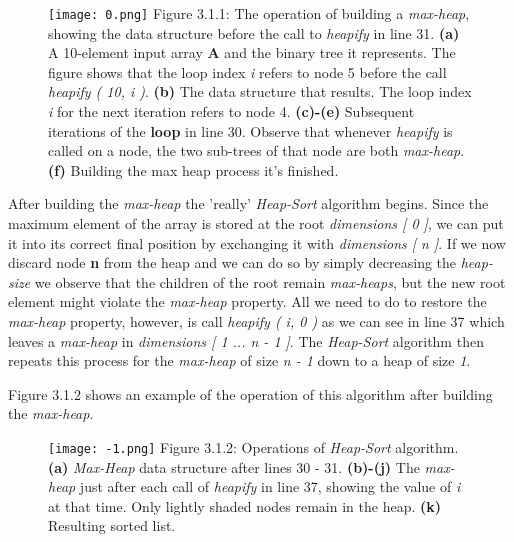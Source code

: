 \begin{figure}[H]
\texttt{[image: 0.png]}
{\centering \linebreak \linebreak \small Figure 3.1.1: The operation of building a {\itshape max-heap}, showing the data structure before the call to {\itshape heapify} in line 31. {\bfseries (a)} A 10-element input array {\bfseries A} and the binary tree it represents. The figure shows that the loop index {\itshape i} refers to node 5 before the call {\itshape heapify ( 10, i )}. {\bfseries (b)} The data structure that results. The loop index {\itshape i} for the next iteration refers to node 4. {\bfseries (c)-(e)} Subsequent iterations of the {\bfseries loop} in line 30. Observe that whenever {\itshape heapify} is called on a node, the two sub-trees of that node are both {\itshape max-heap}. {\bfseries (f)} Building the max heap process it's finished.}
\end{figure} \hfill \break

After building the {\itshape max-heap} the 'really' {\itshape Heap-Sort} algorithm begins. Since the maximum element of the array is stored at the root {\itshape dimensions [ 0 ]}, we can put it into its correct final position by exchanging it with {\itshape dimensions [ n ]}. If we now discard node {\bfseries n} from the heap and we can do so by simply decreasing the {\itshape heap-size} we observe that the children of the root remain {\itshape max-heaps}, but the new root element might violate the {\itshape max-heap} property. All we need to do to restore the {\itshape max-heap} property, however, is call {\itshape heapify ( i, 0 )} as we can see in line 37 which leaves a {\itshape max-heap} in {\itshape dimensions [ 1 ... n - 1 ]}. The {\itshape Heap-Sort} algorithm then repeats this process for the {\itshape max-heap} of size {\itshape n - 1} down to a heap of size {\itshape 1}. \hfill \break

Figure 3.1.2 shows an example of the operation of this algorithm after building the {\itshape max-heap}. \hfill \break 

\begin{figure}[H]
\texttt{[image: -1.png]}
{\centering \linebreak \linebreak \small Figure 3.1.2: Operations of {\itshape Heap-Sort} algorithm. {\bfseries (a)} {\itshape Max-Heap} data structure after lines 30 - 31. {\bfseries (b)-(j)} The {\itshape max-heap} just after each call of {\itshape heapify} in line 37, showing the value of {\itshape i} at that time. Only lightly shaded nodes remain in the heap. {\bfseries (k)} Resulting sorted list.}
\end{figure}
